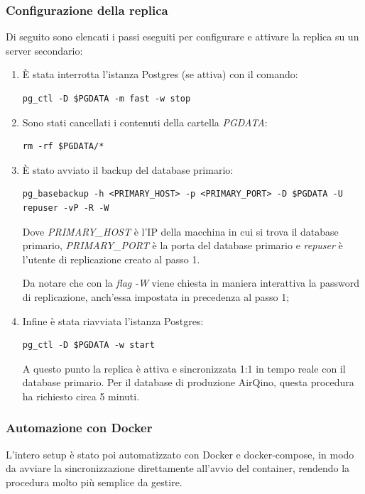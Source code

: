 \subsubsection{Configurazione della replica}\label{conf-repl}
Di seguito sono elencati i passi eseguiti per configurare e attivare la replica su un server secondario:

\begin{enumerate}
  \item È stata interrotta l'istanza Postgres (se attiva) con il comando:
  \vspace{1mm}
\begin{lstlisting}[]
pg_ctl -D $PGDATA -m fast -w stop
\end{lstlisting}
  \item Sono stati cancellati i contenuti della cartella \textit{PGDATA}:
  \vspace{1mm}
\begin{lstlisting}[]
rm -rf $PGDATA/*
\end{lstlisting}
  \item È stato avviato il backup del database primario:
  \vspace{1mm}
\begin{lstlisting}[]
pg_basebackup -h <PRIMARY_HOST> -p <PRIMARY_PORT> -D $PGDATA -U repuser -vP -R -W
\end{lstlisting}
Dove \textit{PRIMARY\_HOST} è l'IP della macchina in cui si trova il database primario, \textit{PRIMARY\_PORT} è la porta del database primario e \textit{repuser} è l'utente di replicazione creato al passo 1.

Da notare che con la \textit{flag} \textit{-W} viene chiesta in maniera interattiva la password di replicazione, anch'essa impostata in precedenza al passo 1;
  \item Infine è stata riavviata l'istanza Postgres:
  \vspace{1mm}
\begin{lstlisting}[]
pg_ctl -D $PGDATA -w start
\end{lstlisting}
A questo punto la replica è attiva e sincronizzata 1:1 in tempo reale con il database primario. Per il database di produzione AirQino, questa procedura ha richiesto circa 5 minuti.
\end{enumerate}

\subsubsection{Automazione con Docker}
L'intero setup è stato poi automatizzato con Docker \cite{docker} e docker-compose, in modo da avviare la sincronizzazione direttamente all'avvio del container, rendendo la procedura molto più semplice da gestire.

